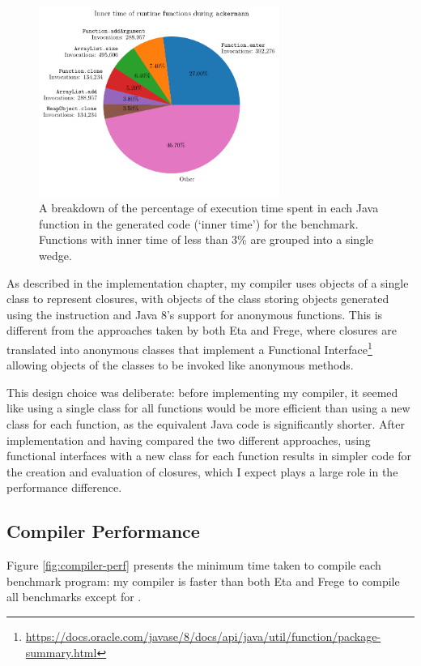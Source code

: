 \documentclass[dissertation.tex]{subfiles}
\begin{document}
{{        \begin{figure}[h]
            \centering
            \captionsetup{width=0.9\textwidth}
            \includegraphics[width=0.7\textwidth]{graphs/perf_profile_ackermann.pdf}
            \caption{A breakdown of the percentage of execution time spent in each Java function in the generated code (`inner time') for the  benchmark. Functions with inner time of less than 3\% are grouped into a single wedge.}
            \label{fig:inner-time}
        \end{figure}

        As described in the implementation chapter, my compiler uses objects of a single class to represent closures, with objects of the class storing  objects generated using the  instruction and Java 8's support for anonymous functions. This is different from the approaches taken by both Eta and Frege, where closures are translated into anonymous classes that implement a Functional Interface\footnote{\url{https://docs.oracle.com/javase/8/docs/api/java/util/function/package-summary.html}} allowing objects of the classes to be invoked like anonymous methods.

        This design choice was deliberate: before implementing my compiler, it seemed like using a single class for all functions would be more efficient than using a new class for each function, as the equivalent Java code is significantly shorter. After implementation and having compared the two different approaches, using functional interfaces with a new class for each function results in simpler code for the creation and evaluation of closures, which I expect plays a large role in the performance difference.
    }
    \subsection{Compiler Performance}
    {
        Figure \ref{fig:compiler-perf} presents the minimum time taken to compile each benchmark program: my compiler is faster than both Eta and Frege to compile all benchmarks except for . 

}}
\end{document}
